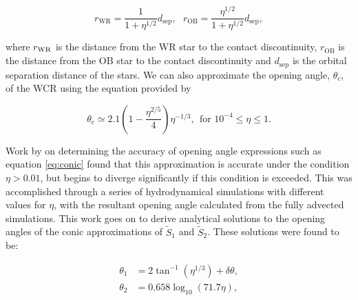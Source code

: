 \begin{equation}
  r_\text{WR} = \frac{1}{1+\eta^{1/2}} d_\text{sep} , ~~~ r_\text{OB} = \frac{\eta^{1/2}}{1+\eta^{1/2}} d_\text{sep} ,
\end{equation}

\noindent
where $r_\text{WR}$ is the distance from the WR star to the contact discontinuity, $r_\text{OB}$ is the distance from the OB star to the contact discontinuity and $d_\text{sep}$ is the orbital separation distance of the stars.
We can also approximate the opening angle, $\theta_c$, of the WCR using the equation provided by \textcite{eichler_particle_1993}

\begin{equation}
  \theta_c \simeq 2.1 \left(1 - \frac{\eta^{2/5}}{4}\right) \eta^{-1/3}, ~~ \text{for } 10^{-4} \leq \eta \leq 1. \label{eq:conic}
\end{equation}



\noindent
Work by \textcite{pittardCollidingStellarWinds2018} on determining the accuracy of opening angle expressions such as equation \ref{eq:conic} found that this approximation is accurate under the condition $\eta > 0.01$, but begins to diverge significantly if this condition is exceeded.
This was accomplished through a series of hydrodynamical simulations with different values for $\eta$, with the resultant opening angle calculated from the fully advected simulations.
This work goes on to derive analytical solutions to the opening angles of the conic approximations of $\widetilde{S}_1$ and $\widetilde{S}_2$.
These solutions were found to be:

\begin{subequations}
  \begin{align}
    \theta_1 & = 2 \tan^{-1} \left(\eta^{1/3}\right) + \delta \theta , \\
    \theta_2 & = 0.658 \log_{10} \left(71.7 \eta \right) ,
  \end{align}
\end{subequations}

